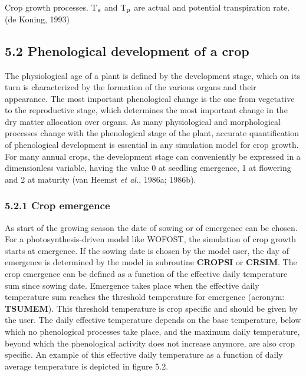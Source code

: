\documentclass[11pt]{article}
\newcommand{\FigDir}{.}
\begin{document}
\begin{indenting}{2.54cm}
Crop growth pro\-cesses. {\small T$_{{\rm a}}$ and T$_{{\rm p}}$ are actual and potential transpiration rate.} (de
Koning, 1993)
\end{indenting}
\newpage

\subsection{  5.2 {\nobreak}Phenological development of a crop  }

The physio\-logical age of a plant is defined by the development stage, which on its turn is
characterized by the forma\-tion of the various organs and their appear\-ance. The most
important phenological change is the one from vegetative to the reproduc\-tive stage, which
determines the most important change in the dry matter allocation over organs. As many
physiologi\-cal and morphological processes change with the phenological stage of the
plant, accurate quantification of phenological {\nobreak}development is essential in any simulation
model for crop growth. For many annual crops, the development stage can conveniently
be expressed in a dimensionless variable, having the value 0 at seedling emergence, 1 at
flowering and 2 at maturity (van Heemst {\it et al.\/}, 1986a; 1986b). 

\bigskip
\bigskip

\subsubsection{  5.2.1 Crop emergence  }

As start of the growing season the date of sowing or of emergence can be chosen. For a
photosynthesis-driven model like WOFOST, the simulation of crop growth starts at
emergence. If the sowing date is chosen by the model user, the day of emergence is
determined by the model in subroutine {\bf CROPSI} or {\bf CRSIM}. The crop emer\-gence can be
defined as a function of the effective daily temperature sum since sowing date. Emergence
takes place when the effective daily temperature sum reaches the threshold temperature
for emergence (acronym: {\bf TSUMEM}). This threshold temperature is crop specific and
should be given by the user. The daily effective temperature depends on the base
tempera\-ture, below which no phenologi\-cal process\-es take place, and the maximum daily
tempera\-ture, beyond which the phenological activity does not increase anymore, are also
crop specific. An example of this effective daily tempera\-ture as a function of daily
average temperature is depicted in figure 5.2.\\
\begin{figure}[htbp]
\begin{forcewidth}{10.05cm}
 \begin{center}\InputPS{\FigDir/TEFFMAX.eps} \end{center}
\end{forcewidth}
\end{figure}
\end{document}
